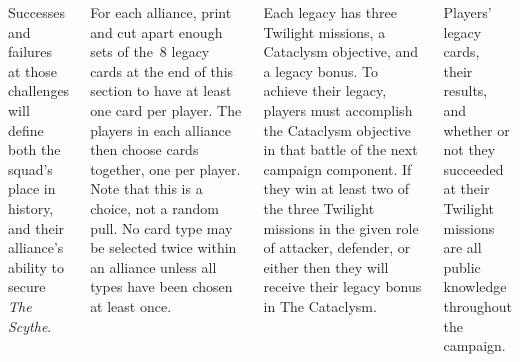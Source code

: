 \begin{columns}
\smallskip%
Successes and failures at those challenges will define both the
squad's place in history, and their alliance's ability to secure
\emph{The Scythe}.


For each alliance, print and cut apart enough sets of the~8 legacy
cards at the end of this section to have at least one card per player.
The players in each alliance then choose cards together, one per
player.  Note that this is a choice, not a random pull.  No card type
may be selected twice within an alliance unless all types have been
chosen at least once.


Each legacy has three Twilight missions, a Cataclysm objective, and a
legacy bonus.  To achieve their legacy, players must accomplish the
Cataclysm objective in that battle of the next campaign component.  If
they win at least two of the three Twilight missions in the given role
of attacker, defender, or either then they will receive their legacy
bonus in The Cataclysm.

Players' legacy cards, their results, and whether or not they
succeeded at their Twilight missions are all public knowledge
throughout the campaign.

\end{columns}

